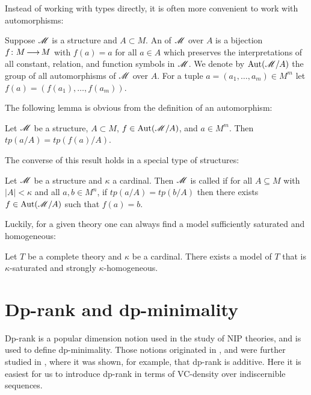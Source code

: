 Instead of working with types directly, it is often more convenient to work with automorphisms:
\begin{Definition}
  Suppose $\mathscr M$ is a structure and $A \subset M$.
  An  of $\mathscr M$ over $A$ is a bijection $f \colon M \operatorname{\longrightarrow} M$
  with $f(a) = a$ for all $a \in A$ which preserves the interpretations of all
  constant, relation, and function symbols in $\mathscr M$.
  We denote by $\operatorname{Aut}(\mathscr M/A)$ the group of all automorphisms of $\mathscr M$ over $A$.
  For a tuple $a = (a_1, \ldots, a_m) \in M^m$ let $f(a) = (f(a_1), \ldots, f(a_m))$.
\end{Definition}

The following lemma is obvious from the definition of an automorphism:
\begin{Lemma}
  Let $\mathscr M$ be a structure, $A \subset M$, $f \in \operatorname{Aut}(\mathscr M/A)$, and $a \in M^m$.
  Then $tp(a/A) = tp(f(a)/A)$.
\end{Lemma}

The converse of this result holds in a special type of structures:
\begin{Definition}
  Let $\mathscr M$ be a structure and $\kappa$ a cardinal.
  Then $\mathscr M$ is called  if for all $A \subseteq M$ with $|A| < \kappa$
  and all $a, b \in M^n$, if $tp(a/A) = tp(b/A)$ then
  there exists $f \in \operatorname{Aut}(\mathscr M/A)$ such that $f(a) = b$.
\end{Definition}

Luckily, for a given theory one can always find a model sufficiently saturated and homogeneous:
\begin{Lemma} 
  Let $T$ be a complete theory and $\kappa$ be a cardinal.
  There exists a model of $T$ that is $\kappa$-saturated and strongly $\kappa$-homogeneous.
\end{Lemma}




\section{Dp-rank and dp-minimality}

Dp-rank is a popular dimension notion used in the study of NIP theories, and is used to define dp-minimality.
Those notions originated in \cite{shelah_dp}, and were further studied in \cite{dp_add},
where it was shown, for example, that dp-rank is additive.
Here it is easiest for us to introduce dp-rank in terms of VC-density over indiscernible sequences.

